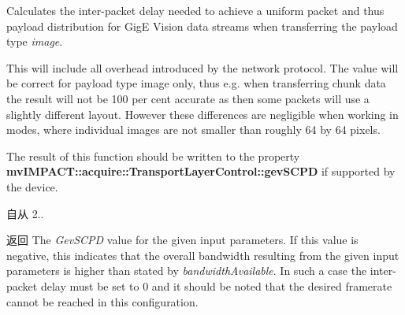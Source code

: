 Calculates the inter-\/packet delay needed to achieve a uniform packet and thus payload distribution for Gig\+E Vision data streams when transferring the payload type {\itshape image}. 

This will include all overhead introduced by the network protocol. The value will be correct for payload type image only, thus e.\+g. when transferring chunk data the result will not be 100 per cent accurate as then some packets will use a slightly different layout. However these differences are negligible when working in modes, where individual images are not smaller than roughly 64 by 64 pixels.

The result of this function should be written to the property {\bfseries mv\+I\+M\+P\+A\+C\+T\+::acquire\+::\+Transport\+Layer\+Control\+::gev\+S\+C\+P\+D} if supported by the device. \begin{DoxySince}{自从}
2.. 
\end{DoxySince}
\begin{DoxyReturn}{返回}
The {\itshape Gev\+S\+C\+P\+D} value for the given input parameters. If this value is negative, this indicates that the overall bandwidth resulting from the given input parameters is higher than stated by {\itshape bandwidth\+Available}. In such a case the inter-\/packet delay must be set to 0 and it should be noted that the desired framerate cannot be reached in this configuration. 
\end{DoxyReturn}

